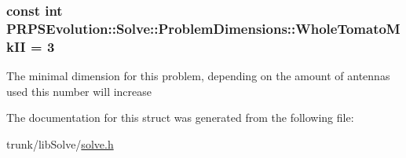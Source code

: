 \hypertarget{struct_p_r_p_s_evolution_1_1_solve_1_1_problem_dimensions_afe2da474e32975df166dfc35688e5f62}{
\subsubsection[{\-Whole\-Tomato\-Mk\-I\-I}]{\setlength{\rightskip}{0pt plus 5cm}const int {\bf \-P\-R\-P\-S\-Evolution\-::\-Solve\-::\-Problem\-Dimensions\-::\-Whole\-Tomato\-Mk\-I\-I} = 3}}\label{struct_p_r_p_s_evolution_1_1_solve_1_1_problem_dimensions_afe2da474e32975df166dfc35688e5f62}
\-The minimal dimension for this problem, depending on the amount of antennas used this number will increase 

\-The documentation for this struct was generated from the following file\-:\begin{DoxyCompactItemize}
\item 
trunk/lib\-Solve/\hyperlink{solve_8h}{solve.\-h}\end{DoxyCompactItemize}
